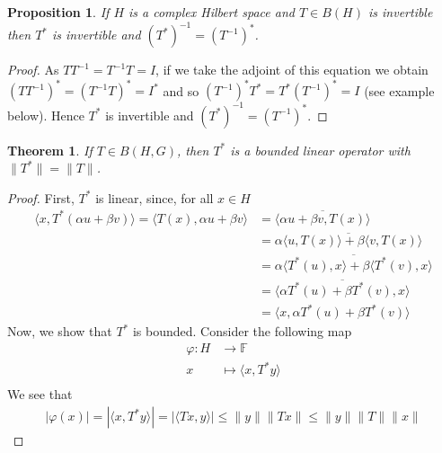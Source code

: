 \documentclass{report}
\newtheorem{thm}{Theorem}
\newtheorem{prop}{Proposition}
\begin{document}
\begin{prop}
If $H$ is a complex Hilbert space and $T \in B(H)$ is invertible then $T^*$ is invertible and $(T^*)^{-1} = (T^{-1})^*$.
\end{prop}

\begin{proof}
As $TT^{-1} = T^{-1}T = I$, if we take the adjoint of this equation we obtain $(TT^{-1})^* = (T^{-1}T)^* = I^*$ and so $(T^{-1})^*T^* = T^*(T^{-1})^* = I$ (see example below). Hence $T^*$ is invertible and $(T^*)^{-1} = (T^{-1})^*$.
\end{proof}

\begin{thm}
  If $T\in B(H,G)$, then $T^{*}$ is a bounded linear operator with $\lVert T^{*}\rVert = \lVert T\rVert$.
\end{thm}
\begin{proof}
  First, $T^{*}$ is linear, since, for all $x\in H$
  $$
  \begin{aligned}
    \langle x,T^{*}(\alpha u+\beta v)\rangle = \langle T(x), \alpha u+\beta v\rangle &= \overline{\langle \alpha u+\beta v, T(x)\rangle} \\
                                                                                     &= \overline{\alpha\langle u,T(x)\rangle+\beta\langle v,T(x)\rangle} \\
                                                                                     &= \overline{\alpha\langle T^{*}(u),x\rangle+\beta\langle T^{*}(v),x\rangle} \\
                                                                                     &= \overline{\langle\alpha T^{*}(u)+\beta T^{*}(v),x\rangle} \\
                                                                                     &= \langle x,\alpha T^{*}(u)+\beta T^{*}(v)\rangle
  \end{aligned}
  $$
  Now, we show that $T^{*}$ is bounded. Consider the following map
  $$
  \begin{aligned}
    \varphi:H&\longrightarrow\mathbb{F} \\
    x&\longmapsto\langle x,T^{*}y\rangle\\
  \end{aligned}
  $$
  We see that
  $$
  \begin{aligned}
    |\varphi(x)| = |\langle x,T^{*}y\rangle| = |\langle Tx,y\rangle|\leq\lVert y\rVert\lVert Tx\rVert\leq\lVert y\rVert\lVert T\rVert\lVert x\rVert
  \end{aligned}
$$
\end{proof}
\end{document}
